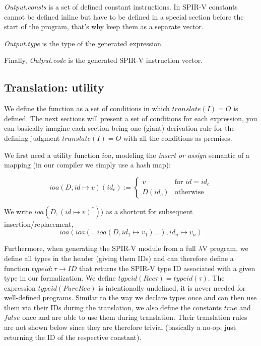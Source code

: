 \documentclass[letterpaper,12pt]{article}
\begin{document}
\textit{Output.consts} is a set of defined constant instructions. In SPIR-V constants
cannot be defined inline but have to be defined in a special section before
the start of the program, that's why keep them as a separate vector.

\textit{Output.type} is the type of the generated expression.

Finally, \textit{Output.code} is the generated SPIR-V instruction vector.

\subsection{Translation: utility}

We define the function as a set of conditions in which $translate(I) = O$
is defined. The next sections will present a set of conditions for each
expression, you can basically imagine each section being one (giant)
derivation rule for the defining judgment $translate(I) = O$
with all the conditions as premises. 

We first need a utility function $ioa$, modeling
the \textit{insert or assign} semantic of a mapping (in our compiler
we simply use a hash map):

\[
	ioa(D, id \mapsto v)(id_c) :=
	\begin{cases}
		v & \text{for } id = id_c \\
		D(id_c) & \text{otherwise}
	\end{cases}
\]

We write $ioa(D, (id \mapsto v)^*))$ as a shortcut for subsequent
insertion/replacement, \\
\[
	ioa(ioa( \dots ioa(D, id_1 \mapsto v_1) \dots ), id_n \mapsto v_n)
\]

Furthermore, when generating the SPIR-V module from a full $\lambda$V program,
we define all types in the header (giving them IDs) and can therefore define a
function $typeid: \tau \rightarrow ID$ that returns the SPIR-V type ID
associated with a given type in our formalization. 
We define $typeid(Rec \tau) = typeid(\tau)$. The expression $typeid(PureRec)$
is intentionally undefined, it is never needed for well-defined programs.
Similar to the way we declare types once and can then use them via their
IDs during the translation, we also define the constants $true$ and $false$
once and are able to use them during translation. Their translation
rules are not shown below since they are therefore trivial (basically
a no-op, just returning the ID of the respective constant).
\end{document}

